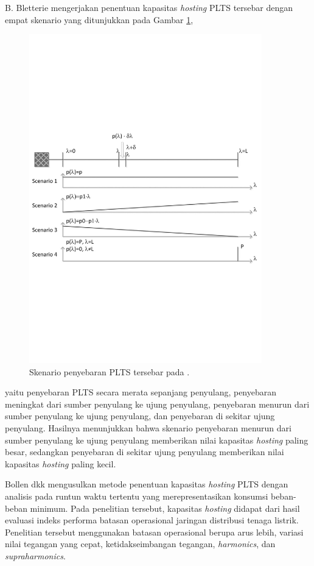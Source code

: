 {{{B. Bletterie  mengerjakan penentuan kapasitas \textit{hosting} PLTS tersebar dengan empat skenario \cite{Bletterie2017} yang ditunjukkan pada Gambar \ref{methodbletterie}, 
\begin{figure}[!h]
	\centering
	\includegraphics[width=0.9\textwidth]{Fig/methodbletterie}
	\caption{Skenario penyebaran PLTS tersebar pada \cite{Bletterie2017}.}
	\label{methodbletterie}
\end{figure}
yaitu penyebaran PLTS secara merata sepanjang penyulang, penyebaran meningkat dari sumber penyulang ke ujung penyulang, penyebaran menurun dari sumber penyulang ke ujung penyulang, dan penyebaran di sekitar ujung penyulang. Hasilnya menunjukkan bahwa skenario penyebaran menurun dari sumber penyulang ke ujung penyulang memberikan nilai kapasitas \textit{hosting} paling besar, sedangkan penyebaran di sekitar ujung penyulang memberikan nilai kapasitas \textit{hosting} paling kecil.


Bollen dkk \cite{Bollen2017} mengusulkan metode penentuan kapasitas \textit{hosting} PLTS dengan analisis pada runtun waktu tertentu yang merepresentasikan konsumsi beban-beban minimum. Pada penelitian tersebut, kapasitas \textit{hosting} didapat dari hasil evaluasi indeks performa batasan operasional jaringan distribusi tenaga listrik. Penelitian tersebut menggunakan batasan operasional berupa arus lebih, variasi nilai tegangan yang cepat, ketidakseimbangan tegangan, \textit{harmonics}, dan \textit{supraharmonics}.

}}}
